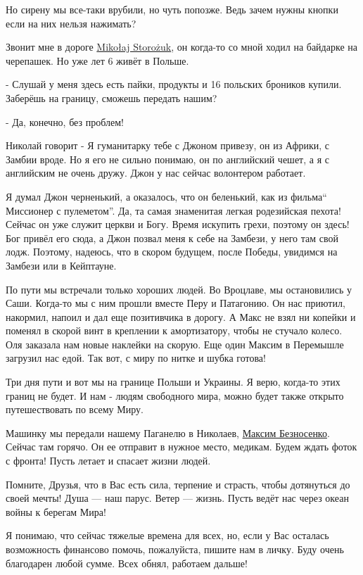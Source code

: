 Но сирену мы все-таки врубили, но чуть попозже. Ведь зачем нужны кнопки если на
них нельзя нажимать?

Звонит мне в дороге
\href{https://www.facebook.com/profile.php?id=100004658208358}{Mikołaj
Storożuk}, он когда-то со мной ходил на байдарке на черепашек. Но уже лет 6
живёт в Польше.

- Слушай у меня здесь есть пайки, продукты и 16 польских броников купили. Заберёшь на границу, сможешь передать нашим? 

- Да, конечно, без проблем! 

Николай говорит - Я гуманитарку тебе с Джоном привезу, он из Африки, с Замбии
вроде. Но я его не сильно понимаю, он по английский чешет, а я с английским не
очень дружу. Джон у нас сейчас волонтером работает. 

Я думал Джон черненький, а оказалось, что он беленький, как из фильма\enquote{
Миссионер с пулеметом}. Да, та самая знаменитая легкая родезийская пехота!
Сейчас он уже служит церкви и Богу. Время искупить грехи, поэтому он здесь!
Бог привёл его сюда, а Джон позвал меня к себе на Замбези, у него там свой
лодж. Поэтому, надеюсь, что в скором будущем, после Победы, увидимся на Замбези
или в Кейптауне.

По пути мы встречали только хороших людей. Во Вроцлаве, мы остановились у Саши.
Когда-то мы с ним прошли вместе Перу и Патагонию. Он нас приютил, накормил,
напоил и дал еще позитивчика в дорогу.  А Макс не взял ни копейки и поменял в
скорой винт в креплении к амортизатору, чтобы не стучало колесо. Оля заказала
нам новые наклейки на скорую. Еще один Максим в Перемышле загрузил нас едой.
Так вот, с миру по нитке и шубка готова!

Три дня пути и вот мы на границе Польши и Украины. Я верю, когда-то этих границ
не будет. И нам - людям свободного мира, можно будет также открыто
путешествовать по всему Миру.  

Машинку мы передали нашему Паганелю в Николаев,
\href{https://www.facebook.com/maxim.beznosenko}{Максим Безносенко}. Сейчас там
горячо. Он ее отправит в нужное место, медикам. Будем ждать фоток с фронта!
Пусть летает и спасает жизни людей.

Помните, Друзья, что в Вас есть сила, терпение и страсть, чтобы дотянуться до
своей мечты!  Душа — наш парус. Ветер — жизнь. Пусть ведёт нас через океан
войны к берегам Мира! 

Я понимаю,  что сейчас тяжелые времена для всех, но, если у Вас осталась
возможность финансово помочь, пожалуйста, пишите нам в личку. Буду очень
благодарен любой сумме. Всех обнял, работаем дальше!
